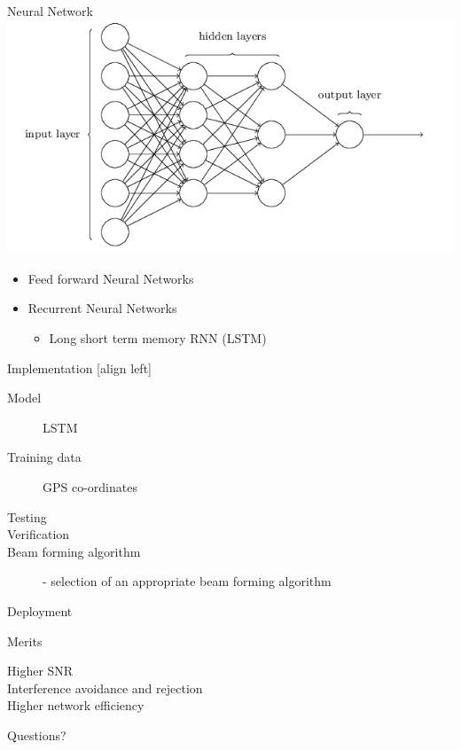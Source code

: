 \documentclass[10pt]{beamer}
\begin{document}
\begin{frame}{Neural Network}
\includegraphics[width=\textwidth]{src/neuralnet.png} 
\begin{itemize}[<+- | alert@+>]
    \item  Feed forward Neural Networks
    \item  Recurrent Neural Networks 
    \begin{itemize}
    \item Long short term memory RNN (LSTM)
    \end{itemize}
  \end{itemize}
\end{frame}

\begin{frame}{Implementation}
[align left]
	\begin{description}
		\item [Model] LSTM
		\item [Training data] GPS co-ordinates
		\item [Testing]
		\item [Verification]
		\item [Beam forming algorithm] - selection of an appropriate beam forming algorithm
		\item [Deployment]
	\end{description}
\end{frame}

\begin{frame}{Merits}
	\begin{description}
		\item [Higher SNR] 
		\item [Interference avoidance and rejection] 
		\item [Higher network efficiency] 
	\end{description}
\end{frame}

{
\begin{frame}[standout]
  Questions?
\end{frame}
}
\end{document}
